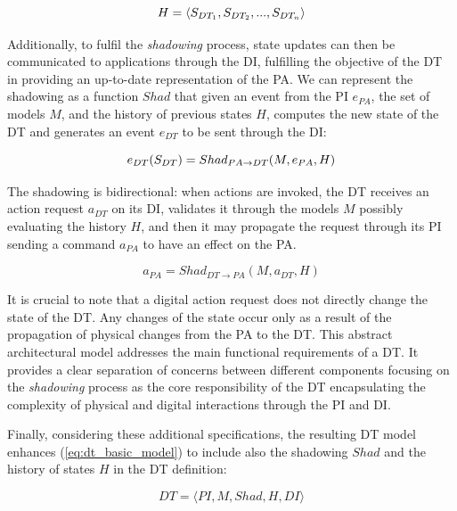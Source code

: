 \begin{equation}\label{eq:dt_history}
        H = \langle S_{DT_1}, S_{DT_2}, ... , S_{DT_n}\rangle\\
\end{equation}

Additionally, to fulfil the \emph{shadowing} process, 
state updates can then be communicated to applications through the \ac{DI}, fulfilling the objective of the \ac{DT} in providing an up-to-date representation of the \ac{PA}.
%
We can represent the shadowing as a function $Shad$ that given an event from the \ac{PI} $e_{PA}$, the set of models $M$, and the history of previous states $H$, computes the new state of the \ac{DT} and generates an event $e_{DT}$ to be sent through the \ac{DI}:

\begin{equation}
        e_{DT}(S_{DT}) = Shad_{PA \rightarrow DT}(M, e_{PA}, H) \\
\end{equation}

The shadowing is bidirectional:
when actions are invoked, the \ac{DT} receives an action request $a_{DT}$ on its \ac{DI}, validates it through the models $M$ possibly evaluating the history $H$, and then it may propagate the request through its \ac{PI} sending a command $a_{PA}$ to have an effect on the \ac{PA}.

\begin{equation}
    a_{PA} = Shad_{DT \rightarrow PA}(M, a_{DT}, H)
\end{equation}

It is crucial to note that a digital action request does not directly change the state of the \ac{DT}.
Any changes of the state occur only as a result of the propagation of physical changes from the \ac{PA} to the \ac{DT}.
This abstract architectural model addresses the main functional requirements of a \ac{DT}.
It provides a clear separation of concerns between different components focusing on the \emph{shadowing} process as the core responsibility of the \ac{DT} encapsulating the complexity of physical and digital interactions through the \ac{PI} and \ac{DI}. 


Finally, considering these additional specifications, the resulting \ac{DT} model enhances (\ref{eq:dt_basic_model}) to include also the shadowing $Shad$ and the history of states $H$ in the \ac{DT} definition:

\begin{equation}\label{eq:5D_dt_model}
    DT = \langle PI, M, Shad, H, DI \rangle
\end{equation}

